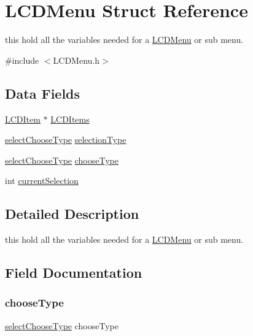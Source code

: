 \hypertarget{struct_l_c_d_menu}{}\section{L\+C\+D\+Menu Struct Reference}
\label{struct_l_c_d_menu}


this hold all the variables needed for a \hyperlink{struct_l_c_d_menu}{L\+C\+D\+Menu} or sub menu.  




{\ttfamily \#include $<$L\+C\+D\+Menu.\+h$>$}

\subsection*{Data Fields}
\begin{DoxyCompactItemize}
\item 
\hyperlink{struct_l_c_d_item}{L\+C\+D\+Item} $\ast$ \hyperlink{struct_l_c_d_menu_af6fd93180925837331f93529da0f9ce5}{L\+C\+D\+Items}
\item 
\hyperlink{_l_c_d_menu_8h_ac9d30bf238ddf19edf16db21e5362e58}{select\+Choose\+Type} \hyperlink{struct_l_c_d_menu_ab58ecc3135bdf1f2198a918c52b3dad6}{selection\+Type}
\item 
\hyperlink{_l_c_d_menu_8h_ac9d30bf238ddf19edf16db21e5362e58}{select\+Choose\+Type} \hyperlink{struct_l_c_d_menu_a91177ef36dcf8cabe8e74a627755aaa2}{choose\+Type}
\item 
int \hyperlink{struct_l_c_d_menu_a0e589f9054cc1ee0716a7ecda74b1352}{current\+Selection}
\end{DoxyCompactItemize}


\subsection{Detailed Description}
this hold all the variables needed for a \hyperlink{struct_l_c_d_menu}{L\+C\+D\+Menu} or sub menu. 

\subsection{Field Documentation}
\hypertarget{struct_l_c_d_menu_a91177ef36dcf8cabe8e74a627755aaa2}{}\label{struct_l_c_d_menu_a91177ef36dcf8cabe8e74a627755aaa2} 
\subsubsection{\texorpdfstring{choose\+Type}{chooseType}}
{\footnotesize\ttfamily \hyperlink{_l_c_d_menu_8h_ac9d30bf238ddf19edf16db21e5362e58}{select\+Choose\+Type} choose\+Type}

